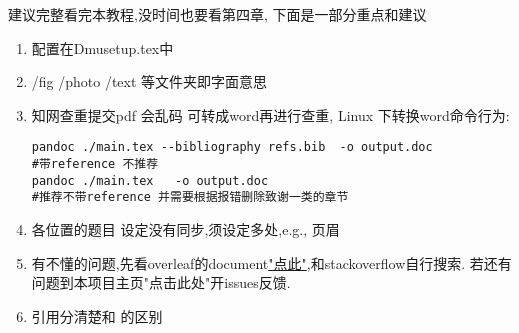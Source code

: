 建议完整看完本教程,没时间也要看第四章, 下面是一部分重点和建议
\begin{enumerate}
    \item 配置在Dmusetup.tex中 
    \item /fig /photo /text 等文件夹即字面意思
    \item 知网查重提交pdf 会乱码 可转成word再进行查重, Linux 下转换word命令行为: 
    \begin{lstlisting}
pandoc ./main.tex --bibliography refs.bib  -o output.doc
#带reference 不推荐
pandoc ./main.tex   -o output.doc 
#推荐不带reference 并需要根据报错删除致谢一类的章节
  \end{lstlisting}
  \item 各位置的题目 设定没有同步,须设定多处,e.g., 页眉
  \item 有不懂的问题,先看overleaf的document\href{https://www.overleaf.com/learn}{"点此"},和stackoverflow自行搜索. 若还有问题到本项目主页"点击此处"开issues反馈.
  \item 引用分清楚\cite{hart_initializing_2012}和 的区别
\end{enumerate}

 






